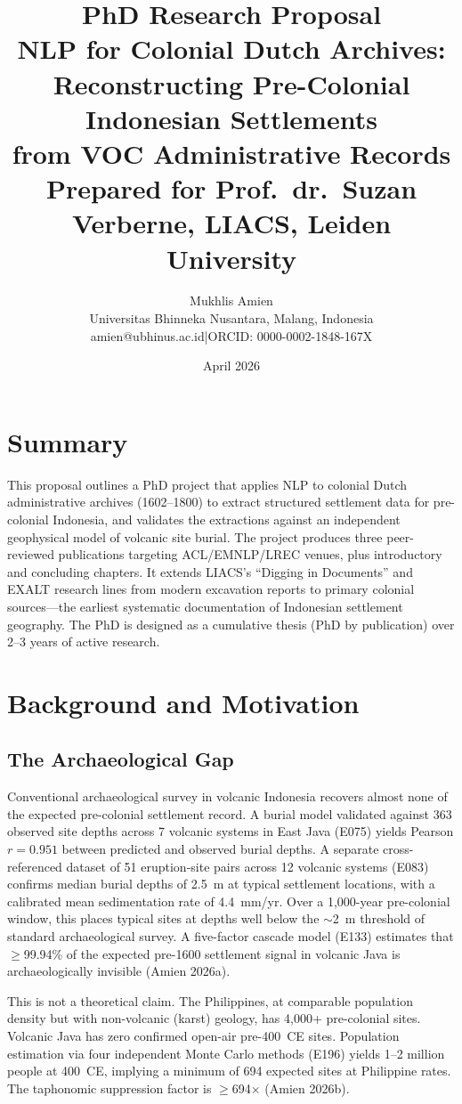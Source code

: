 \documentclass[11pt,a4paper]{article}
\title{\textbf{PhD Research Proposal}\\[0.5em]
\large NLP for Colonial Dutch Archives:\\
Reconstructing Pre-Colonial Indonesian Settlements\\
from VOC Administrative Records\\[1em]
\normalsize Prepared for Prof.\ dr.\ Suzan Verberne, LIACS, Leiden University}
\author{Mukhlis Amien\\
\small Universitas Bhinneka Nusantara, Malang, Indonesia\\
\small amien@ubhinus.ac.id\quad|\quad ORCID: 0000-0002-1848-167X}
\date{April 2026}
\begin{document}
\maketitle

\section{Summary}

This proposal outlines a PhD project that applies NLP to colonial Dutch administrative archives (1602--1800) to extract structured settlement data for pre-colonial Indonesia, and validates the extractions against an independent geophysical model of volcanic site burial. The project produces three peer-reviewed publications targeting ACL/EMNLP/LREC venues, plus introductory and concluding chapters. It extends LIACS's ``Digging in Documents'' and EXALT research lines from modern excavation reports to primary colonial sources---the earliest systematic documentation of Indonesian settlement geography. The PhD is designed as a cumulative thesis (PhD by publication) over 2--3 years of active research.

\section{Background and Motivation}

\subsection{The Archaeological Gap}

Conventional archaeological survey in volcanic Indonesia recovers almost none of the expected pre-colonial settlement record. A burial model validated against 363 observed site depths across 7 volcanic systems in East Java (E075) yields Pearson $r = 0.951$ between predicted and observed burial depths. A separate cross-referenced dataset of 51 eruption-site pairs across 12 volcanic systems (E083) confirms median burial depths of 2.5~m at typical settlement locations, with a calibrated mean sedimentation rate of 4.4~mm/yr. Over a 1,000-year pre-colonial window, this places typical sites at depths well below the $\sim$2~m threshold of standard archaeological survey. A five-factor cascade model (E133) estimates that $\geq$99.94\% of the expected pre-1600 settlement signal in volcanic Java is archaeologically invisible (Amien 2026a).

This is not a theoretical claim. The Philippines, at comparable population density but with non-volcanic (karst) geology, has 4,000+ pre-colonial sites. Volcanic Java has zero confirmed open-air pre-400~CE sites. Population estimation via four independent Monte Carlo methods (E196) yields 1--2 million people at 400~CE, implying a minimum of 694 expected sites at Philippine rates. The taphonomic suppression factor is $\geq$694$\times$ (Amien 2026b).
\end{document}

